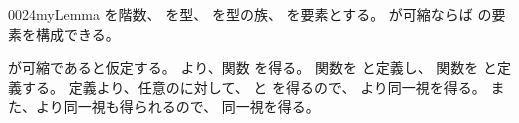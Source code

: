 \documentclass[index]{subfiles}
\begin{document}
\begin{myBlock}{0024}{myLemma}
  を階数、
  を型、
  を型の族、
  を要素とする。
  が可縮ならば
  の要素を構成できる。
\end{myBlock}
\begin{myProof}
  が可縮であると仮定する。
  より、関数
  を得る。
  関数を
  と定義し、
  関数を
  と定義する。
  定義より、任意のに対して、
  と
  を得るので、
  より同一視を得る。
  また、より同一視も得られるので、
  同一視を得る。
\end{myProof}
\end{document}

